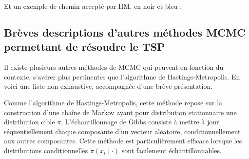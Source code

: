 \documentclass{article}
\begin{document}
\begin{tcolorbox}[colback=white,colframe=yellow!80!black,title=Exemple 2, breakable]
Et un exemple de chemin accepté par HM, en noir et bleu :
\begin{center}
\end{center}
\end{tcolorbox}



\subsection{Brèves descriptions d'autres méthodes MCMC permettant de résoudre le TSP}

Il existe plusieurs autres méthodes de MCMC qui peuvent en fonction du contexte, s'avérer plus pertinentes que l'algorithme de Hastings-Metropolis.
En voici une liste non exhaustive, accompagnée d'une brève présentation. \\

\begin{tcolorbox}[colback=white,colframe=yellow!80!black,title=L'échantillonnage de Gibbs]
Comme l'algorithme de Hastings-Metropolis, 
cette méthode repose sur la construction d'une chaîne de Markov ayant pour distribution stationnaire une distribution cible $\pi$. 
L'échantillonnage de Gibbs consiste à mettre à jour séquentiellement chaque composante d'un vecteur aléatoire, conditionnellement aux autres composantes. 
Cette méthode est particulièrement efficace lorsque les distributions conditionnelles $\pi(x_i \mid \cdot)$ sont facilement échantillonnables.
\end{tcolorbox}
\end{document}
